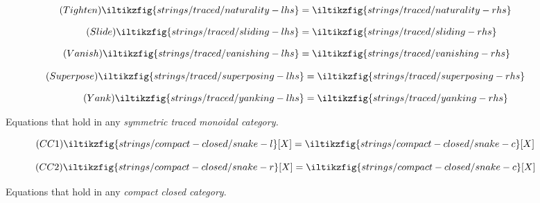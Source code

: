 \begin{figure}[p]
    \centering
    \begin{minipage}{0.52\textwidth}
        \begin{align*}
            \tag{\(\mathsf{Tighten}\)}
            \iltikzfig{strings/traced/naturality-lhs}
            &=
            \iltikzfig{strings/traced/naturality-rhs}
            \label{eq:tightening}
            \\[0.75em]
            \tag{\(\mathsf{Slide}\)}
            \iltikzfig{strings/traced/sliding-lhs}
            &=
            \iltikzfig{strings/traced/sliding-rhs}
            \label{eq:sliding}
            \\[0.75em]
            \tag{\(\mathsf{Vanish}\)}
            \iltikzfig{strings/traced/vanishing-lhs}
            &=
            \iltikzfig{strings/traced/vanishing-rhs}
            \label{eq:vanishing}
        \end{align*}
    \end{minipage}
    \hspace{-1em}
    \begin{minipage}{0.455\textwidth}
        \begin{align*}
            \tag{\(\mathsf{Superpose}\)}
            \iltikzfig{strings/traced/superposing-lhs}
            &=
            \iltikzfig{strings/traced/superposing-rhs}
            \label{eq:superposing}
            \\[0.75em]
            \tag{\(\mathsf{Yank}\)}
            \iltikzfig{strings/traced/yanking-lhs}
            &=
            \iltikzfig{strings/traced/yanking-rhs}
            \label{eq:yanking}
        \end{align*}
    \end{minipage}
    \caption{
        Equations that hold in any \emph{symmetric traced monoidal category.}
    }
    \label{fig:stmc-axioms}
\end{figure}
\begin{figure}[p]
    \centering
    \begin{minipage}{0.29\textwidth}
        \begin{equation}
            \tag{\(\mathsf{CC1}\)}
            \iltikzfig{strings/compact-closed/snake-l}[X]
            =
            \iltikzfig{strings/compact-closed/snake-c}[X]
            \label{eq:snake-l}
        \end{equation}
    \end{minipage}
    \begin{minipage}{0.29\textwidth}
        \begin{equation}
            \tag{\(\mathsf{CC2}\)}
            \iltikzfig{strings/compact-closed/snake-r}[X]
            =
            \iltikzfig{strings/compact-closed/snake-c}[X]
            \label{eq:snake-r}
        \end{equation}
    \end{minipage}
    \caption{
        Equations that hold in any \emph{compact closed category}.
    }
    \label{fig:ccc-axioms}
\end{figure}
